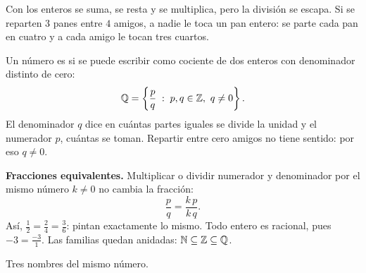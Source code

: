 \documentclass[11pt,a4paper]{article}
\begin{document}
Con los enteros se suma, se resta y se multiplica, pero la división se escapa. Si se reparten $3$ panes entre $4$
amigos, a nadie le toca un pan entero: se parte cada pan en cuatro y a cada amigo le tocan tres cuartos.
\begin{figura}
\end{figura}

\begin{definicion}
Un número es  si se puede escribir como cociente de dos enteros con denominador distinto de cero:
\[ \Q=\left\{\frac{p}{q}\tq p,q\in\Z,\ q\neq0\right\}. \]
El denominador $q$ dice en cuántas partes iguales se divide la unidad y el numerador $p$, cuántas se toman.
Repartir entre cero amigos no tiene sentido: por eso $q\neq0$.
\end{definicion}

\begin{minipage}[c]{0.56\linewidth}
\textbf{\color{zaccent}Fracciones equivalentes.} Multiplicar o dividir numerador y denominador por el mismo número
$k\neq0$ no cambia la fracción:
\[ \frac{p}{q}=\frac{k\,p}{k\,q}. \]
Así, $\tfrac12=\tfrac24=\tfrac36$: pintan exactamente lo mismo. Todo entero es racional, pues $-3=\tfrac{-3}{1}$.
Las familias quedan anidadas: $\mathbb{N}\subseteq\mathbb{Z}\subseteq\mathbb{Q}$.
\end{minipage}\hfill
\begin{minipage}[c]{0.4\linewidth}\centering
{}

{\small\color{zmute}Tres nombres del mismo número.}
\end{minipage}
\end{document}
